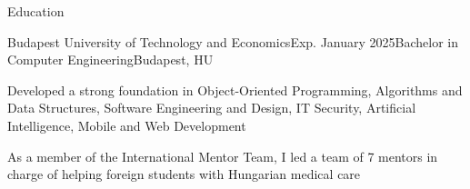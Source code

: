 \documentclass[
	a4paper, %
	11pt, %
]{resume} %
\begin{document}

\begin{rSection}{Education}

	\begin{rSubsection}{Budapest University of Technology and Economics}{Exp. January 2025}{Bachelor in Computer Engineering}{Budapest, HU}
		\item Developed a strong foundation in Object-Oriented Programming, Algorithms and Data Structures, Software Engineering and Design, IT Security, Artificial Intelligence, Mobile and Web Development
		\item As a member of the International Mentor Team, I led a team of 7 mentors in charge of helping foreign students with Hungarian medical care
	\end{rSubsection}

\end{rSection}

\end{document}
